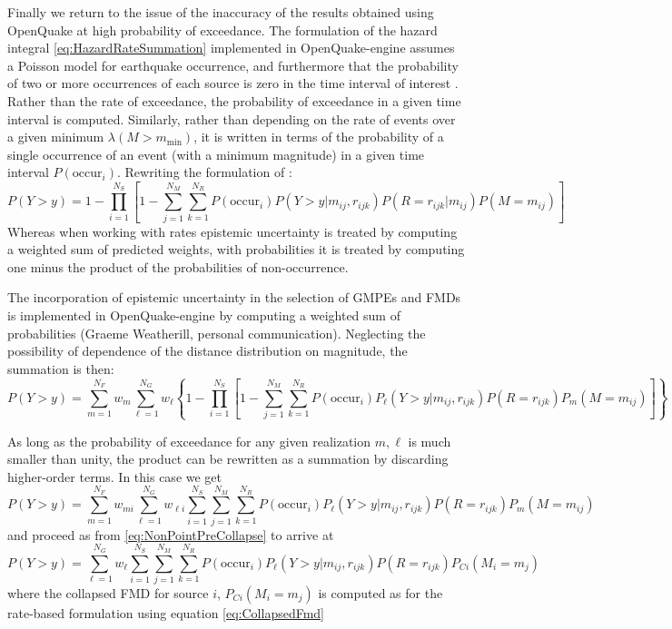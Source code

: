 \documentclass{article}
\begin{document}
Finally we return to the issue of the inaccuracy of the results obtained using OpenQuake at high probability of exceedance. 
The formulation of the hazard integral \eqref{eq:HazardRateSummation} implemented in OpenQuake-engine assumes a Poisson model for earthquake occurrence, and furthermore that the probability of two or more occurrences of each source is zero in the time interval of interest \citep{field2003opensha,pagani2014openquake}.
Rather than the rate of exceedance, the probability of exceedance in a given time interval is computed.
Similarly, rather than depending on the rate of events over a given minimum $\lambda(M > m_\text{min})$, it is written in terms of the probability of a single occurrence of an event (with a minimum magnitude) in a given time interval $P(\text{occur}_i)$.
Rewriting the formulation of \citet[equation~A9]{field2003opensha}:
$$ 
P(Y > y) = 
1 - \prod_{i=1}^{N_S} \left[
1 - \sum_{j=1}^{N_M} \sum_{k=1}^{N_R} 
P(\text{occur}_i) 
P(Y > y | m_{ij},r_{ijk}) 
P(R=r_{ijk} | m_{ij})
P(M=m_{ij}) \right]
$$ 
Whereas when working with rates epistemic uncertainty is treated by computing a weighted sum of predicted weights, with probabilities it is treated by computing one minus the product of the probabilities of non-occurrence.

The incorporation of epistemic uncertainty in the selection of GMPEs and FMDs is implemented in OpenQuake-engine by computing a weighted sum of probabilities (Graeme Weatherill, personal communication).
Neglecting the possibility of dependence of the distance distribution on magnitude, the summation is then:
$$ 
P(Y > y) = 
\sum_{m=1}^{N_F} w_m 
\sum_{\ell=1}^{N_G} w_\ell \left\{
1 - \prod_{i=1}^{N_S} \left[
1 - \sum_{j=1}^{N_M} \sum_{k=1}^{N_R} 
P(\text{occur}_i) 
P_\ell(Y > y | m_{ij},r_{ijk}) 
P(R=r_{ijk})
P_m(M=m_{ij}) \right] \right\}
$$ 

As long as the probability of exceedance for any given realization $m,\ell$ is much smaller than unity, the product can be rewritten as a summation by discarding higher-order terms. In this case we get
$$ 
P(Y > y) = 
\sum_{m=1}^{N_F} w_{mi} 
\sum_{\ell=1}^{N_G} w_{\ell i}
\sum_{i=1}^{N_S} 
\sum_{j=1}^{N_M} 
\sum_{k=1}^{N_R} 
P(\text{occur}_i) 
P_\ell(Y > y | m_{ij},r_{ijk}) 
P(R=r_{ijk})
P_m(M=m_{ij})
$$ 
and proceed as from \eqref{eq:NonPointPreCollapse} to arrive at
$$ 
P(Y > y) = 
\sum_{\ell=1}^{N_G} w_\ell 
\sum_{i=1}^{N_S} 
\sum_{j=1}^{N_M} 
\sum_{k=1}^{N_R} 
P(\text{occur}_i) 
P_\ell(Y > y | m_{ij},r_{ijk}) 
P(R=r_{ijk})
P_{Ci}(M_i = m_j)
$$ 
where the collapsed FMD for source $i$, $P_{Ci}(M_i = m_j)$ is computed as for the rate-based formulation using equation \eqref{eq:CollapsedFmd}
\end{document}
